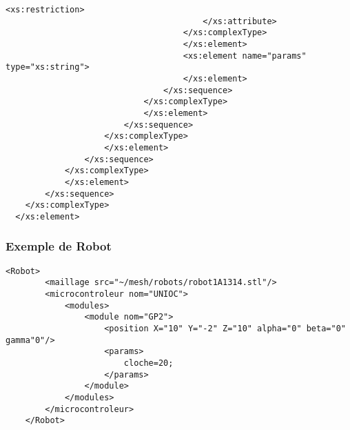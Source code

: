 \begin{changemargin}{-1cm}{-1cm}
\begin{lstlisting}[caption=Description du Robot, label=descbot]
                                            <xs:restriction>
                                        </xs:attribute>
                                    </xs:complexType>
                                    </xs:element>
                                    <xs:element name="params" type="xs:string">
                                    </xs:element>
                                </xs:sequence>
                            </xs:complexType>
                            </xs:element>
                        </xs:sequence>
                    </xs:complexType>
                    </xs:element>
                </xs:sequence>
            </xs:complexType>
            </xs:element>
        </xs:sequence>
    </xs:complexType>
  </xs:element>
  \end{lstlisting}
\end{changemargin}

\subsubsection{Exemple de Robot}
\begin{lstlisting}[caption=Description de la Table, label=desctable]
	<Robot>
		<maillage src="~/mesh/robots/robot1A1314.stl"/>
		<microcontroleur nom="UNIOC">
			<modules>
				<module nom="GP2">
					<position X="10" Y="-2" Z="10" alpha="0" beta="0" gamma"0"/>
					<params>
						cloche=20;
					</params>
				</module>
			</modules>
		</microcontroleur>
	</Robot>
\end{lstlisting}
  
\clearpage
